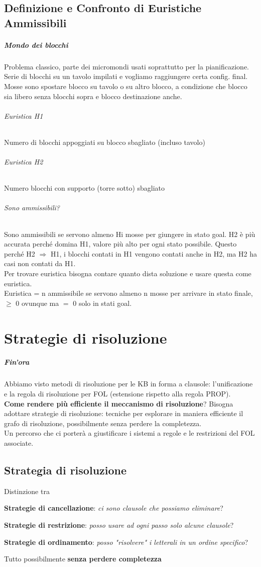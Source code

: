 \documentclass[10pt]{book}
\begin{document}
\section{Definizione e Confronto di Euristiche Ammissibili}
\paragraph{Mondo dei blocchi} Problema classico, parte dei micromondi usati soprattutto per la pianificazione. Serie di blocchi su un tavolo impilati e vogliamo raggiungere certa config. final. Mosse sono spostare blocco su tavolo o su altro blocco, a condizione che blocco sia libero senza blocchi sopra e blocco destinazione anche.
\subparagraph{Euristica H1} Numero di blocchi appoggiati su blocco sbagliato (incluso tavolo)
\subparagraph{Euristica H2} Numero blocchi con supporto (torre sotto) sbagliato
\subparagraph{Sono ammissibili?} Sono ammissibili se servono almeno Hi mosse per giungere in stato goal. H2 è più accurata perché domina H1, valore più alto per ogni stato possibile. Questo perché H2 $\Rightarrow$ H1, i blocchi contati in H1 vengono contati anche in H2, ma H2 ha casi non contati da H1.\\
Per trovare euristica bisogna contare quanto dista soluzione e usare questa come euristica.\\
Euristica = n ammissibile se servono almeno n mosse per arrivare in stato finale, $\geq$ 0 ovunque ma $=$ 0 solo in stati goal.

\chapter{Strategie di risoluzione}
\paragraph{Fin'ora} Abbiamo visto metodi di risoluzione per le KB in forma a clausole: l'unificazione e la regola di risoluzione per FOL (estensione rispetto alla regola PROP).\\
\textbf{Come rendere più efficiente il meccanismo di risoluzione}? Bisogna adottare strategie di risoluzione: tecniche per esplorare in maniera efficiente il grafo di risoluzione, possibilmente senza perdere la completezza.\\
Un percorso che ci porterà a giustificare i sistemi a regole e le restrizioni del FOL associate.
\section{Strategia di risoluzione}
Distinzione tra 
	\begin{list}{}{}
		\item \textbf{Strategie di cancellazione}: \textit{ci sono clausole che possiamo eliminare}?
		\item \textbf{Strategie di restrizione}: \textit{posso usare ad ogni passo solo alcune clausole}?
		\item \textbf{Strategie di ordinamento}: \textit{posso "risolvere" i letterali in un ordine specifico}?
	\end{list}
Tutto possibilmente \textbf{senza perdere completezza}
\end{document}

